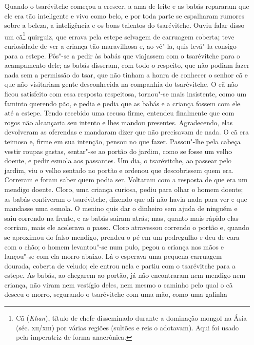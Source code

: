 Quando o tsarévitche começou a crescer, a ama de leite e as babás
repararam que ele era tão inteligente e vivo como belo, e por toda parte
se espalharam rumores sobre a beleza, a inteligência e os bons talentos
do tsarévitche. Ouviu falar disso um cã\footnote{Cã (\emph{Khan}),
  título de chefe disseminado durante a dominação mongol na Ásia (séc.
  \textsc{xii/xiii}) por várias regiões (sultões e reis o adotavam). Aqui foi
  usado pela imperatriz de forma anacrônica.} quirguiz, que errava
pela estepe selvagem de carruagem coberta; teve curiosidade de ver a
criança tão maravilhosa e, ao vê"-la, quis levá"-la consigo para a estepe.
Pôs"-se a pedir às babás que viajassem com o tsarévitche para o acampamento
dele; as babás disseram, com todo o respeito, que não podiam fazer nada
sem a permissão do tsar, que não tinham a honra de conhecer o senhor cã
e que não visitariam gente desconhecida na companhia do tsarévitche. O
cã não ficou satisfeito com essa resposta respeitosa, tornou"-se mais
insistente, como um faminto querendo pão, e pedia e pedia que as babás e
a criança fossem com ele até a estepe. Tendo recebido uma recusa firme,
entendeu finalmente que com rogos não alcançaria seu intento e lhes
mandou presentes. Agradecendo, elas devolveram as oferendas e mandaram
dizer que não precisavam de nada. O cã era teimoso e, firme em sua
intenção, pensou no que fazer. Passou"-lhe pela cabeça vestir roupas
gastas, sentar"-se ao portão do jardim, como se fosse um velho doente, e
pedir esmola aos passantes. Um dia, o tsarévitche, ao passear pelo
jardim, viu o velho sentado no portão e ordenou que descobrissem quem
era. Correram e foram saber quem podia ser. Voltaram com a resposta de
que era um mendigo doente. Cloro, uma criança curiosa, pediu para olhar
o homem doente; as babás contiveram o tsarévitche, dizendo que ali não
havia nada para ver e que mandasse uma esmola. O menino quis dar o
dinheiro sem ajuda de ninguém e saiu correndo na frente, e as babás
saíram atrás; mas, quanto mais rápido elas corriam, mais ele acelerava o
passo. Cloro atravessou correndo o portão e, quando se aproximou do
falso mendigo, prendeu o pé em um pedregulho e deu de cara com o chão; o
homem levantou"-se num pulo, pegou a criança nas mãos e lançou"-se com ela
morro abaixo. Lá o esperava uma pequena carruagem dourada, coberta de
veludo; ele entrou nela e partiu com o tsarévitche para a estepe. As
babás, ao chegarem ao portão, já não encontraram nem mendigo nem
criança, não viram nem vestígio deles, nem mesmo o caminho pelo qual o
cã desceu o morro, segurando o tsarévitche com uma mão, como uma galinha
